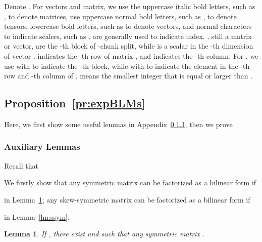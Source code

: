 \documentclass[10pt,journal,compsoc]{IEEEtran}
\newtheorem{lemma}{Lemma}
\begin{document}
Denote . 
For vectors and matrix, we use the uppercase  italic bold letters, such as 
, to denote matrices,
use uppercase normal bold letters, such as , to denote tensors,
lowercase bold letters, such as  to denote vectors,
and normal characters to indicate scalers, such as .
 are generally used to indicate index.
, still a matrix or vector, are the -th block of -chunk split,
while  is a scalar in the -th dimension of vector .
 indicates the -th row of matrix ,
and  indicates the -th column.
For , 
we use  with  to indicate the -th block,
while  with  
to indicate the element in the -th row and -th column of .
 means the smallest integer that is equal or larger than .


\subsection{Proposition~\ref{pr:expBLMs}}
\label{app:expBLMs}

Here,
we first show some useful lemmas
in Appendix~\ref{app:lem1},
then we prove 


\subsubsection{Auxiliary Lemmas}
\label{app:lem1}

Recall that 
 
We firstly show that 
any symmetric matrix can be factorized as a bilinear form if 
 
in Lemma~\ref{lm:sym};
any skew-symmetric matrix can be factorized as a bilinear form if

in Lemma~\ref{lm:ssym}.

\begin{lemma}
\label{lm:sym}
If ,
there exist  and  
such that any symmetric matrix .
\end{lemma}
\end{document}
